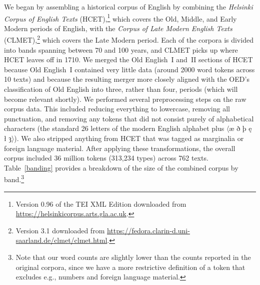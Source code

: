 \documentclass[doc,biblatex]{apa7}
\newcommand\spelling[1]{\allowbreak$\langle$#1$\rangle$}
\begin{document}
We began by assembling a historical corpus of English by combining the \textit{Helsinki Corpus of English Texts} (HCET),\footnote{Version 0.96 of the TEI XML Edition downloaded from \url{https://helsinkicorpus.arts.gla.ac.uk}.} which covers the Old, Middle, and Early Modern periods of English, with the \textit{Corpus of Late Modern English Texts} (CLMET),\footnote{Version 3.1 downloaded from \url{https://fedora.clarin-d.uni-saarland.de/clmet/clmet.html}.} which covers the Late Modern period. Each of the corpora is divided into bands spanning between 70 and 100 years, and CLMET picks up where HCET leaves off in 1710. We merged the Old English~I and~II sections of HCET because Old English~I contained very little data (around 2000 word tokens across 10 texts) and because the resulting merger more closely aligned with the OED's classification of Old English into three, rather than four, periods (which will become relevant shortly). We performed several preprocessing steps on the raw corpus data. This included reducing everything to lowercase, removing all punctuation, and removing any tokens that did not consist purely of alphabetical characters (the standard 26 letters of the modern English alphabet plus \spelling{æ ð þ ę ł ȝ}). We also stripped anything from HCET that was tagged as marginalia or foreign language material. After applying these transformations, the overall corpus included 36 million tokens (313,234 types) across 762 texts. Table~\ref{banding} provides a breakdown of the size of the combined corpus by band.\footnote{Note that our word counts are slightly lower than the counts reported in the original corpora, since we have a more restrictive definition of a token that excludes e.g., numbers and foreign language material.}
\end{document}
